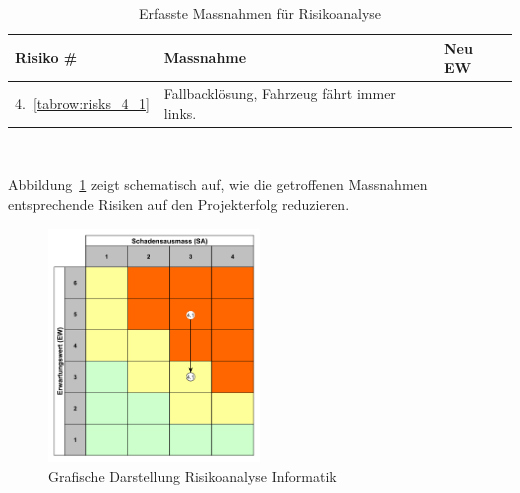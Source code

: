 \documentclass[main.tex]{subfiles} %
\begin{document}
\begin{table}[H]
    \begin{tabularx}{\textwidth}{|>{\centering\arraybackslash}p{2cm}|>{\raggedright\arraybackslash}X|>{\centering\arraybackslash}p{0.75cm}|}
        \hline
        \textbf{Risiko \#}        & \textbf{Massnahme}
                                  & \textbf{Neu EW}                             \\

        \hline
        \rowcolor{yellow!30}
        4.~\ref{tabrow:risks_4_1} & Fallbacklösung, Fahrzeug fährt immer links.
                                  & 3                                           \\

        \hline

    \end{tabularx}
    \caption{Erfasste Massnahmen für Risikoanalyse}~\label{tab:Erfasste_Massnahmen}
\end{table}

Abbildung~\ref{fig:Diagramm_Risiko_info} zeigt schematisch auf, wie die
getroffenen Massnahmen entsprechende Risiken auf den Projekterfolg reduzieren.

\begin{figure}[h]
    \centering
    \includegraphics[width=0.5\textwidth]{./Risks_Diagramm/Diagramm_Risiko_info.pdf}
    \caption{Grafische Darstellung Risikoanalyse Informatik}
    \label{fig:Diagramm_Risiko_info}
\end{figure}
\end{document}
